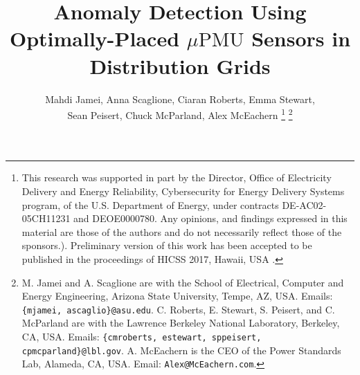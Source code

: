 \documentclass[twocolumn]{IEEEtran}
\newcommand{\mup}{\mu \text{PMU}}
\begin{document}
\title{Anomaly Detection Using Optimally-Placed $\mup$ Sensors in Distribution Grids}

\author{Mahdi Jamei, Anna Scaglione, Ciaran Roberts, Emma Stewart, \\ Sean Peisert, Chuck McParland, Alex McEachern   
    \thanks{This research was supported in part by the Director, Office of Electricity Delivery and Energy Reliability, Cybersecurity for Energy Delivery Systems program, of the U.S. Department of Energy, under contracts DE-AC02-05CH11231 and DEOE0000780. Any opinions, and findings expressed in this material are those of the authors and do not necessarily reflect those of the sponsors.). 
Preliminary version of this work has been accepted to be published in the proceedings of HICSS 2017, Hawaii, USA \cite{jamei2016automated}.}
        \thanks{M. Jamei and A. Scaglione are with the School of Electrical, Computer and Energy Engineering, Arizona State University, Tempe, AZ, USA. Emails: \texttt{\{mjamei, ascaglio\}@asu.edu}. C. Roberts, E. Stewart, S. Peisert, and C. McParland are with the Lawrence Berkeley National Laboratory, Berkeley, CA, USA. Emails: \texttt{\{cmroberts, estewart, sppeisert, cpmcparland\}@lbl.gov}. A. McEachern is the CEO of the Power Standards Lab, Alameda, CA, USA. Email: \texttt{Alex@McEachern.com}.}
         }
\maketitle
\end{document}
